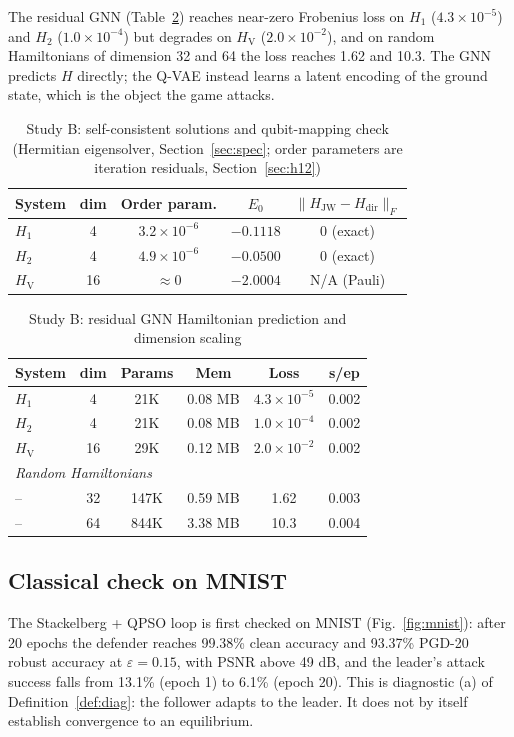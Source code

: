 \documentclass[conference]{IEEEtran}
\newcommand{\HV}{H_{\mathrm{V}}}
\begin{document}
The residual GNN (Table~\ref{tab:gnn}) reaches near-zero Frobenius loss on $H_1$ ($4.3{\times}10^{-5}$) and $H_2$ ($1.0{\times}10^{-4}$) but degrades on $\HV$ ($2.0{\times}10^{-2}$), and on random Hamiltonians of dimension 32 and 64 the loss reaches 1.62 and 10.3. The GNN predicts $H$ directly; the Q-VAE instead learns a latent encoding of the ground state, which is the object the game attacks.

\begin{table}[t]
\centering
\caption{Study B: self-consistent solutions and qubit-mapping check (Hermitian eigensolver, Section~\ref{sec:spec}; order parameters are iteration residuals, Section~\ref{sec:h12})}
\label{tab:sc}
\footnotesize
\begin{tabular}{lcccc}
\toprule
System & dim & Order param. & $E_0$ & $\|H_{\mathrm{JW}}-H_{\mathrm{dir}}\|_F$\\
\midrule
$H_1$ & 4 & $3.2{\times}10^{-6}$ & $-0.1118$ & 0 (exact)\\
$H_2$ & 4 & $4.9{\times}10^{-6}$ & $-0.0500$ & 0 (exact)\\
$\HV$ & 16 & $\approx0$ & $-2.0004$ & N/A (Pauli)\\
\bottomrule
\end{tabular}
\end{table}

\begin{table}[t]
\centering
\caption{Study B: residual GNN Hamiltonian prediction and dimension scaling}
\label{tab:gnn}
\footnotesize
\setlength{\tabcolsep}{4pt}
\begin{tabular}{lccccc}
\toprule
System & dim & Params & Mem & Loss & s/ep\\
\midrule
$H_1$ & 4 & 21K & 0.08 MB & $4.3{\times}10^{-5}$ & 0.002\\
$H_2$ & 4 & 21K & 0.08 MB & $1.0{\times}10^{-4}$ & 0.002\\
$\HV$ & 16 & 29K & 0.12 MB & $2.0{\times}10^{-2}$ & 0.002\\
\midrule
\multicolumn{6}{l}{\emph{Random Hamiltonians}}\\
-- & 32 & 147K & 0.59 MB & 1.62 & 0.003\\
-- & 64 & 844K & 3.38 MB & 10.3 & 0.004\\
\bottomrule
\end{tabular}
\end{table}

\subsection{Classical check on MNIST}
The Stackelberg + QPSO loop is first checked on MNIST (Fig.~\ref{fig:mnist}): after 20 epochs the defender reaches 99.38\% clean accuracy and 93.37\% PGD-20 robust accuracy at $\varepsilon{=}0.15$, with PSNR above 49 dB, and the leader's attack success falls from 13.1\% (epoch 1) to 6.1\% (epoch 20). This is diagnostic (a) of Definition~\ref{def:diag}: the follower adapts to the leader. It does not by itself establish convergence to an equilibrium.
\end{document}
